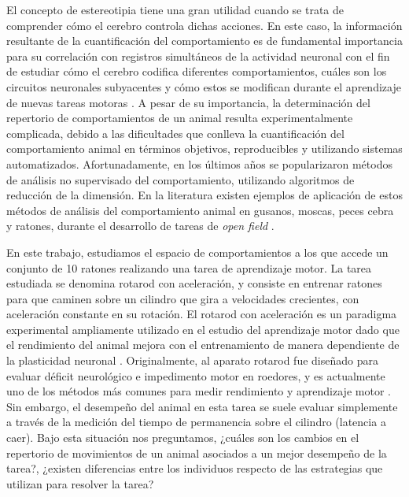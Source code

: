 El concepto de estereotipia tiene una gran utilidad cuando se trata de comprender cómo el cerebro controla dichas acciones.
En este caso, la información resultante de la cuantificación del comportamiento es de fundamental importancia para su correlación con registros simultáneos de la actividad neuronal con el fin de estudiar cómo el cerebro codifica diferentes comportamientos, cuáles son los circuitos neuronales subyacentes y cómo estos se modifican durante el aprendizaje de nuevas tareas motoras \cite{esposito_defensive, levy_representation}. A pesar de su importancia, la determinación del repertorio de comportamientos de un animal resulta experimentalmente complicada, debido a las dificultades que conlleva la cuantificación del comportamiento animal en términos objetivos, reproducibles y utilizando sistemas automatizados. Afortunadamente, en los últimos años se popularizaron métodos de análisis no supervisado del comportamiento, utilizando algoritmos de reducción de la dimensión. En la literatura existen ejemplos de aplicación de estos métodos de análisis del comportamiento animal en gusanos, moscas, peces cebra y ratones, durante el desarrollo de tareas de \textit{open field} \cite{stephens_eigenworms, zebrafish_unsupervised, berman_mapping, berman_hierarchy, markowitz_mouse_behavior, mouse_autism_open_field}.

\clearpage

En este trabajo, estudiamos el espacio de comportamientos a los que accede un conjunto de 10 ratones realizando una tarea de aprendizaje motor. La tarea estudiada se denomina rotarod con aceleración, y consiste en entrenar ratones para que caminen sobre un cilindro que gira a velocidades crecientes, con aceleración constante en su rotación. El rotarod con aceleración es un paradigma experimental ampliamente utilizado en el estudio del aprendizaje motor dado que el rendimiento del animal mejora con el entrenamiento de manera dependiente de la plasticidad neuronal \cite{costa_motor_learning, mouse_tests}. Originalmente, al aparato rotarod fue diseñado para evaluar déficit neurológico e impedimento motor en roedores, y es actualmente uno de los métodos más comunes para medir rendimiento y aprendizaje motor \cite{dunham_rotarod, mouse_tests}. Sin embargo, el desempeño del animal en esta tarea se suele evaluar simplemente a través de la medición del tiempo de permanencia sobre el cilindro (latencia a caer). Bajo esta situación nos preguntamos, ¿cuáles son los cambios en el repertorio de movimientos de un animal asociados a un mejor desempeño de la tarea?, ¿existen diferencias entre los individuos respecto de las estrategias que utilizan para resolver la tarea?

